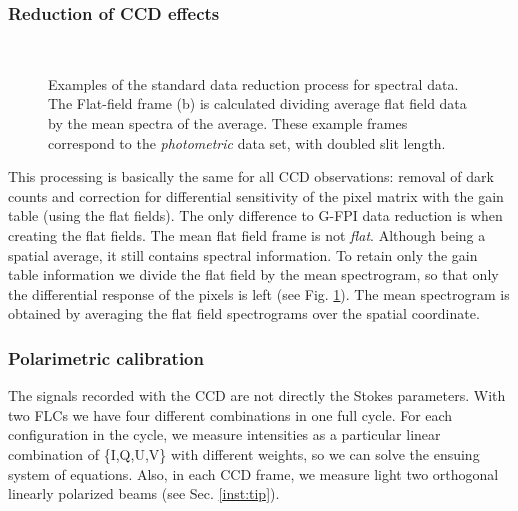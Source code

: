 \subsubsection*{Reduction of CCD effects}
\begin{figure}[t]
  \centering
  \quad%
    \\
  \quad%
  \quad%
    \caption{Examples of the standard data reduction process for spectral data. The Flat-field frame (b) is calculated dividing average flat field data by the mean spectra of the average. These example frames correspond to the \emph{photometric} data set, with doubled slit length.}
\label{tip:flat}
\end{figure}

This processing is basically the same for all CCD observations: removal of dark counts and correction for differential sensitivity of the pixel matrix with the gain table (using the flat fields). The only difference to G-FPI data reduction is when creating the flat fields. The mean flat field frame is not \emph{flat}. Although being a spatial average, it still contains spectral information. To retain only the gain table information we divide the flat field by the mean spectrogram, so that only the differential response of the pixels is left (see Fig. \ref{tip:flat}). The mean spectrogram is obtained by averaging the flat field spectrograms over the spatial coordinate.




\subsubsection*{Polarimetric calibration}
The signals recorded with the CCD are not directly the Stokes parameters. With two FLCs we have four different combinations in one full cycle. For each configuration in the cycle, we measure intensities as a particular linear combination of \{I,Q,U,V\} with different weights, so we can solve the ensuing system of equations. Also, in each CCD frame, we measure light two orthogonal linearly polarized beams (see Sec. \ref{inst:tip}).

